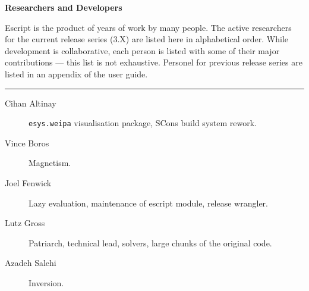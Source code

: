\vbox{}
\vfill
\begin{center}
\textbf{\Large Researchers and Developers}
\vspace{0.5cm}

Escript is the product of years of work by many people.
The active researchers for the current release series (3.X) are listed here in alphabetical order.
While development is collaborative, each person is listed with some of their major contributions --- this list is not exhaustive.
Personel for previous release series are listed in an appendix of the user guide.

\vspace{1cm}
\hrule
\vspace{1cm}
\begin{description}
\item[Cihan Altinay] \texttt{esys.weipa} visualisation package, SCons build system rework.
\item[Vince Boros] Magnetism.
\item[Joel Fenwick] Lazy evaluation, maintenance of escript module, release wrangler.
\item[Lutz Gross] Patriarch, technical lead, solvers, large chunks of the original code.
\item[Azadeh Salehi] Inversion. 
\end{description}
\end{center}
\vfill
\pagebreak

